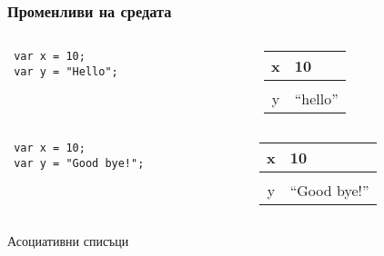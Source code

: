 \documentclass{beamer}
\begin{document}
\begin{frame}[fragile]
\frametitle{Променливи на средата}

\begin{columns}[t]
  \begin{column}{0.5\textwidth}
\begin{flushleft}
\begin{lstlisting}
 var x = 10;
 var y = "Hello"; 
\end{lstlisting}
\end{flushleft}
  \end{column}

  \begin{column}{0.5\textwidth}
\begin{flushleft}
\begin{tabular} {c | l}
  x   & 10 \\
      \hline\\
  y & ``hello''

\end{tabular}  
\end{flushleft}

  \end{column}
\end{columns}


\begin{columns}[t]
  \begin{column}{0.5\textwidth}
\begin{flushleft}
\begin{lstlisting}
 var x = 10;
 var y = "Good bye!"; 
\end{lstlisting}
\end{flushleft}
  \end{column}

  \begin{column}{0.5\textwidth}
\begin{flushleft}
\begin{tabular} {c | l}
  x   & 10 \\
      \hline\\
  y & ``Good bye!''

\end{tabular}  
\end{flushleft}

  \end{column}
\end{columns}
\end{frame}

\begin{frame}
  \centerline{Асоциативни списъци}
\end{frame}
\end{document}
